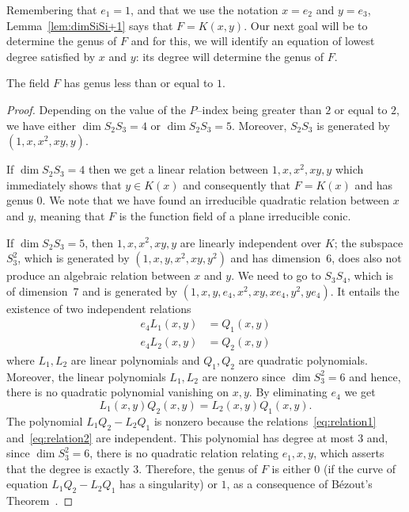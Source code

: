\documentclass[ALCO,Unicode,ThmDefs]{cedram}
\begin{document}
Remembering that $e_1=1$, and that we use the notation $x=e_2$ and $y=e_3$, Lemma~\ref{lem:dimSiSi+1} says that $F=K(x,y)$. Our next goal will be to determine the genus of $F$ and for this, we will identify an equation of lowest degree satisfied by $x$ and $y$: its degree will determine the genus of $F$.

\begin{prop}\label{prop:genus}
The field $F$ has genus less than or equal to $1$.
\end{prop}

\begin{proof}
Depending on the value of the $P$--index being greater than $2$ or equal to $2$, we have either $\dim S_2 S_3=4$ or $\dim S_2 S_3=5$. Moreover, $S_2S_3$ is generated by $(1,x,x^2,xy,y)$.

If $\dim S_2 S_3=4$ then we get a linear relation between $1,x,x^2,xy,y$ which immediately shows that $y\in K(x)$ and consequently that $F=K(x)$ and has genus $0$. We note that we have found an irreducible quadratic relation between $x$ and $y$, meaning that $F$ is the function field of a plane irreducible conic.

If $\dim S_2 S_3=5$, then $1,x,x^2,xy,y$ are linearly independent over $K$; the subspace $S_3^2$, which is generated by $(1, x, y, x^2, x y, y^2)$ and has dimension~$6$, does also not produce an algebraic relation between $x$ and $y$. We need to go to $S_3S_4$, which is of dimension~$7$ and is generated by $(1, x, y, e_4, x^2, x y, x e_4, y^2, y e_4)$. It entails the existence of two independent relations
\begin{align}
e_4 L_1(x,y)&= Q_1(x, y) \label{eq:relation1}\\
e_4 L_2(x,y)&= Q_2(x, y) \label{eq:relation2}
\end{align}
where $L_1, L_2$ are linear polynomials and $Q_1, Q_2$ are quadratic polynomials. Moreover, the linear polynomials $L_1, L_2$ are nonzero since $\dim S_3^2=6$ and hence, there is no quadratic polynomial vanishing on $x, y$. By eliminating $e_4$ we get
\begin{equation}
L_1(x, y) Q_2 (x, y)= L_2(x, y) Q_1(x, y).
\end{equation}
The polynomial $L_1 Q_2 - L_2 Q_1$ is nonzero because the relations~\eqref{eq:relation1} and~\eqref{eq:relation2} are independent. This polynomial has degree at most $3$ and, since $\dim S_3^2=6$, there is no quadratic relation relating $e_1, x, y$, which asserts that the degree is exactly $3$. Therefore, the genus of $F$ is either $0$ (if the curve of equation $L_1 Q_2 - L_2 Q_1$ has a singularity) or $1$, as a consequence of Bézout's Theorem~\cite{Fulton}.
\end{proof}
\end{document}
